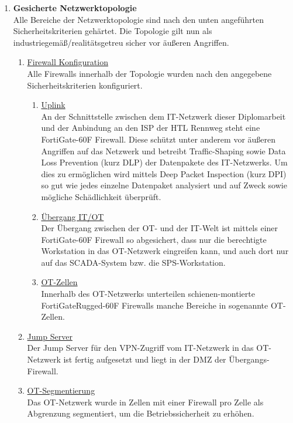 \documentclass[
	headings=optiontotocandhead,%
	oneside,
	numbers=noenddot,%
	toc=flat, %
	10pt, %
	parskip=full, %
	listof=totoc, %
	listof=flat, %
	numbers=noenddot, %
	bibliography=totoc, %
	a4paper,DIV=14,
]{scrartcl}
\begin{document}
\begin{enumerate}[start=1,label={\bfseries Ziel-H \arabic*},leftmargin=*,wide]
\begin{enumerate}[label=\alph*.]
\end{enumerate}
\item{\bfseries{Gesicherte Netzwerktopologie}}\\
Alle Bereiche der Netzwerktopologie sind nach den unten angeführten Sicherheitskriterien gehärtet. Die Topologie gilt nun als industriegemäß/realitätsgetreu sicher vor äußeren Angriffen.

\begin{enumerate}[label=\alph*.]
\item{\underline{Firewall Konfiguration}}\\
Alle Firewalls innerhalb der Topologie wurden nach den angegebene Sicherheitskriterien konfiguriert. 

\begin{enumerate}[label=\roman*.]
\item{\underline{Uplink}}\\
An der Schnittstelle zwischen dem IT-Netzwerk dieser Diplomarbeit und der Anbindung an den ISP der HTL Rennweg steht eine FortiGate-60F Firewall. Diese schützt unter anderem vor äußeren Angriffen auf das Netzwerk und betreibt Traffic-Shaping sowie Data Loss Prevention (kurz DLP) der Datenpakete des IT-Netzwerks. Um dies zu ermöglichen wird mittels Deep Packet Inspection (kurz DPI) so gut wie jedes einzelne Datenpaket analysiert und auf Zweck sowie mögliche Schädlichkeit überprüft.

\item{\underline{Übergang IT/OT}}\\
Der Übergang zwischen der OT- und der IT-Welt ist mittels einer FortiGate-60F Firewall so abgesichert, dass nur die berechtigte Workstation in das OT-Netzwerk eingreifen kann, und auch dort nur auf das SCADA-System bzw. die SPS-Workstation.

\item{\underline{OT-Zellen}}\\
Innerhalb des OT-Netzwerks unterteilen schienen-montierte FortiGateRugged-60F Firewalls manche Bereiche in sogenannte OT-Zellen.
\end{enumerate}

\item{\underline{Jump Server}}\\
Der Jump Server für den VPN-Zugriff vom IT-Netzwerk in das OT-Netzwerk ist fertig aufgesetzt und liegt in der DMZ der Übergangs-Firewall.

\item{\underline{OT-Segmentierung}}\\
Das OT-Netzwerk wurde in Zellen mit einer Firewall pro Zelle als Abgrenzung segmentiert, um die Betriebssicherheit zu erhöhen.


\end{enumerate}
\end{enumerate}
\end{document}
